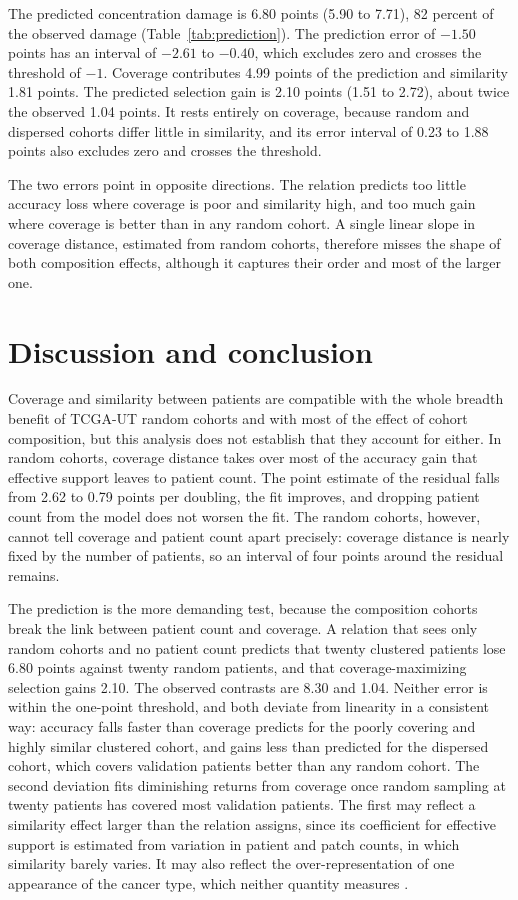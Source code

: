 \noindent The predicted concentration damage is 6.80 points (5.90 to 7.71), 82 percent of the observed damage (Table~\ref{tab:prediction}). The prediction error of $-1.50$ points has an interval of $-2.61$ to $-0.40$, which excludes zero and crosses the threshold of $-1$. Coverage contributes 4.99 points of the prediction and similarity 1.81 points. The predicted selection gain is 2.10 points (1.51 to 2.72), about twice the observed 1.04 points. It rests entirely on coverage, because random and dispersed cohorts differ little in similarity, and its error interval of 0.23 to 1.88 points also excludes zero and crosses the threshold.

The two errors point in opposite directions. The relation predicts too little accuracy loss where coverage is poor and similarity high, and too much gain where coverage is better than in any random cohort. A single linear slope in coverage distance, estimated from random cohorts, therefore misses the shape of both composition effects, although it captures their order and most of the larger one.

\section{Discussion and conclusion}
\label{sec:discussion}
Coverage and similarity between patients are compatible with the whole breadth benefit of TCGA-UT random cohorts and with most of the effect of cohort composition, but this analysis does not establish that they account for either. In random cohorts, coverage distance takes over most of the accuracy gain that effective support leaves to patient count. The point estimate of the residual falls from 2.62 to 0.79 points per doubling, the fit improves, and dropping patient count from the model does not worsen the fit. The random cohorts, however, cannot tell coverage and patient count apart precisely: coverage distance is nearly fixed by the number of patients, so an interval of four points around the residual remains.

The prediction is the more demanding test, because the composition cohorts break the link between patient count and coverage. A relation that sees only random cohorts and no patient count predicts that twenty clustered patients lose 6.80 points against twenty random patients, and that coverage-maximizing selection gains 2.10. The observed contrasts are 8.30 and 1.04. Neither error is within the one-point threshold, and both deviate from linearity in a consistent way: accuracy falls faster than coverage predicts for the poorly covering and highly similar clustered cohort, and gains less than predicted for the dispersed cohort, which covers validation patients better than any random cohort. The second deviation fits diminishing returns from coverage once random sampling at twenty patients has covered most validation patients. The first may reflect a similarity effect larger than the relation assigns, since its coefficient for effective support is estimated from variation in patient and patch counts, in which similarity barely varies. It may also reflect the over-representation of one appearance of the cancer type, which neither quantity measures \citep{queisler2026cohortComposition}.

